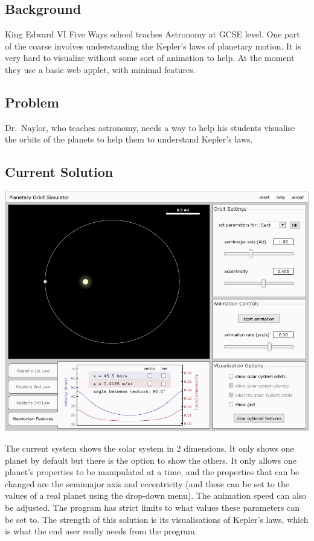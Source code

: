 \subsection{Background}

King Edward VI Five Ways school teaches Astronomy at GCSE level. One part of the
coarse involves understanding the Kepler's laws of planetary motion. It is very hard to
visualize without some sort of animation to help. At the moment they use a basic
web applet, with minimal features.
\fi
\subsection{Problem}
Dr.~Naylor, who teaches astronomy, needs a way to help his students visualise
the orbits of the planets to help them to understand Kepler's laws. 

\subsection{Current Solution}
\includegraphics[width=\textwidth]{./img/existing-solution.png}

The current system shows the solar system in 2 dimensions. It only shows one
planet by default but there is the option to show the others. It only allows one
planet's properties to be manipulated at a time, and the properties that can be
changed are the semimajor axis and eccentricity (and these can be set to the
values of a real planet using the drop-down menu). The animation speed can also
be adjusted. The program has strict limits to what values these parameters can
be set to. The strength of this solution is its visualisations of Kepler's laws,
which is what the end user really needs from the program.

